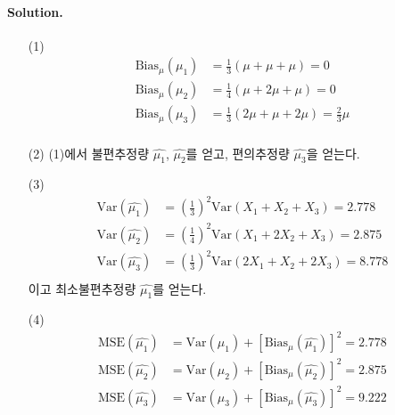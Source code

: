 \paragraph{Solution.}
\begin{itemize}
    \item[(1)] {
        \begin{align*}
            \mathrm{Bias}_{\mu}\left(\hat{\mu_1}\right) &= \frac{1}{3}\left(\mu + \mu + \mu\right) = 0 \\
            \mathrm{Bias}_{\mu}\left(\hat{\mu_2}\right) &= \frac{1}{4}\left(\mu + 2\mu + \mu\right) = 0 \\
            \mathrm{Bias}_{\mu}\left(\hat{\mu_3}\right) &= \frac{1}{3}\left(2\mu + \mu + 2\mu\right) = \frac{2}{3}\mu \\
        \end{align*}
    }
    \item[(2)] {
        (1)에서 불편추정량 $\hat{\mu_1}$, $\hat{\mu_2}$를 얻고, 편의추정량 $\hat{\mu_3}$을 얻는다.
    }
    \item[(3)] {
        \begin{align*}
            \mathrm{Var}\left(\hat{\mu_1}\right) &= \left(\frac{1}{3}\right)^2 \mathrm{Var}\left(X_1+X_2+X_3\right) = 2.778 \\
            \mathrm{Var}\left(\hat{\mu_2}\right) &= \left(\frac{1}{4}\right)^2 \mathrm{Var}\left(X_1+2X_2+X_3\right) = 2.875 \\
            \mathrm{Var}\left(\hat{\mu_3}\right) &= \left(\frac{1}{3}\right)^2 \mathrm{Var}\left(2X_1+X_2+2X_3\right) = 8.778 \\
        \end{align*}
        이고 최소불편추정량 $\hat{\mu_1}$를 얻는다.
    }
    \item[(4)] {
        \begin{align*}
            \mathrm{MSE}\left(\hat{\mu_1}\right) &= \mathrm{Var}\left(\mu_1\right)+\left[\mathrm{Bias}_{\mu}\left(\hat{\mu_1}\right)\right]^2=2.778\\
            \mathrm{MSE}\left(\hat{\mu_2}\right) &= \mathrm{Var}\left(\mu_2\right)+\left[\mathrm{Bias}_{\mu}\left(\hat{\mu_2}\right)\right]^2=2.875\\
            \mathrm{MSE}\left(\hat{\mu_3}\right) &= \mathrm{Var}\left(\mu_3\right)+\left[\mathrm{Bias}_{\mu}\left(\hat{\mu_3}\right)\right]^2=9.222\\
        \end{align*}
    }
\end{itemize}

